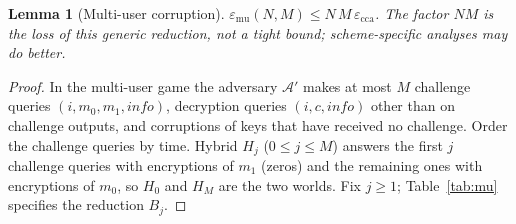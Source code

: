 \documentclass[pdflatex,sn-mathphys-num,twocolumn]{sn-jnl}
\theoremstyle{plain}
\newtheorem{lemma}[theorem]{Lemma}
\theoremstyle{definition}
\begin{document}
\begin{lemma}[Multi-user corruption]\label{lem:mu}
$\varepsilon_{\mathrm{mu}}(N,M)\le N\,M\,\varepsilon_{\mathrm{cca}}$. The factor $NM$ is the loss of this generic reduction, not a tight bound; scheme-specific analyses may do better.
\end{lemma}
\begin{proof}
In the multi-user game the adversary $\mathcal A'$ makes at most $M$ challenge queries $(i,m_0,m_1,\mathit{info})$, decryption queries $(i,c,\mathit{info})$ other than on challenge outputs, and corruptions of keys that have received no challenge. Order the challenge queries by time. Hybrid $H_j$ ($0\le j\le M$) answers the first $j$ challenge queries with encryptions of $m_1$ (zeros) and the remaining ones with encryptions of $m_0$, so $H_0$ and $H_M$ are the two worlds. Fix $j\ge1$; Table~\ref{tab:mu} specifies the reduction $B_j$.


\end{proof}
\end{document}
